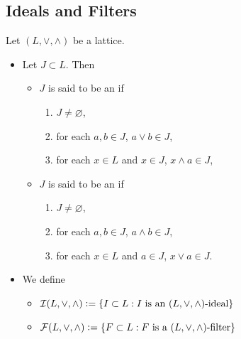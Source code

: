 \documentclass{book}
\begin{document}
	
	
	
	
	
	
	
	
	
	
	
	
	
	
	
	
	
	
	
	
	
	
	
	
	
	
	
	
	
	
	\subsection{Ideals and Filters}
	
	\begin{defn}
		Let $(L, \vee, \wedge)$ be a lattice.  
		\begin{itemize}
			\item Let $J \subset L$. Then
			\begin{itemize}
				\item $J$ is said to be an  if 
				\begin{enumerate}
					\item $J \neq \varnothing$,
					\item for each $a,b \in J$, $a \vee b \in J$,
					\item for each $x \in L$ and $x \in J$, $x \wedge a \in J$,
				\end{enumerate}
				\item $J$ is said to be an  if 
				\begin{enumerate}
					\item $J \neq \varnothing$,
					\item for each $a,b \in J$, $a \wedge b \in J$,
					\item for each $x \in L$ and $a \in J$, $x \vee a \in J$.
				\end{enumerate}
			\end{itemize}
			\item We define 
			\begin{itemize}
				\item $\mathcal{I}(L, \vee, \wedge) \vcentcolon= \{I \subset L: \text{$I$ is an $(L, \vee, \wedge)$-ideal}\}$
				\item $\mathcal{F}(L, \vee, \wedge) \vcentcolon= \{F \subset L: \text{$F$ is a $(L, \vee, \wedge)$-filter}\}$
			\end{itemize}
		\end{itemize}
	\end{defn}
	
\end{document}

